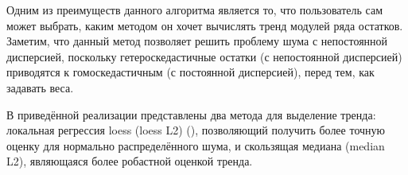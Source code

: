 \documentclass[specialist,
               substylefile = spbu.rtx,
               subf,href,colorlinks=true, 12pt]{disser}
\begin{document}

Одним из преимуществ данного алгоритма является то, что пользователь сам может выбрать, каким методом он хочет вычислять тренд модулей ряда остатков. Заметим, что данный метод позволяет решить проблему шума с непостоянной дисперсией, поскольку гетероскедастичные остатки (с непостоянной дисперсией) приводятся к гомоскедастичным (с постоянной дисперсией), перед тем, как задавать веса.
	
В приведённой реализации представлены два метода для выделение тренда: локальная регрессия loess (loess L2) (\cite{ClevDev1988}), позволяющий получить более точную оценку для нормально распределённого шума, и скользящая медиана (median L2), являющаяся более робастной оценкой тренда.
\end{document}
